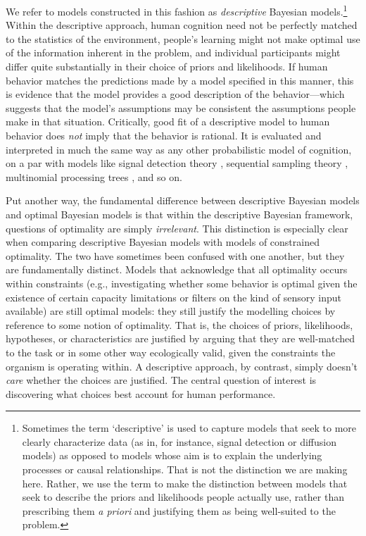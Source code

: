 \documentclass[doc,floatsintext]{apa6}
\begin{document}
We refer to models constructed in this fashion as {\it descriptive} Bayesian models.\footnote{Sometimes the term `descriptive' is used to capture models that seek to more clearly characterize data (as in, for instance, signal detection or diffusion models) as opposed to models whose aim is to explain the underlying processes or causal relationships. That is not the distinction we are making here. Rather, we use the term to make the distinction between models that seek to describe the priors and likelihoods people actually use, rather than prescribing them {\it a priori} and justifying them as being well-suited to the problem.} Within the descriptive approach, human cognition need not be perfectly matched to the statistics of the environment, people's learning might not make optimal use of the information inherent in the problem, and individual participants might differ quite substantially in their choice of priors and likelihoods. If human behavior matches the predictions made by a model specified in this manner, this is evidence that the model provides a good description of the behavior---which suggests that the model's assumptions may be consistent the assumptions people make in that situation. Critically, good fit of a descriptive model to human behavior does {\it not} imply that the behavior is rational. It is evaluated and interpreted in much the same way as any other probabilistic model of cognition, on a par with models like signal detection theory \cite{macmillan_detection_2004}, sequential sampling theory \cite{ratcliff_comparison_2004}, multinomial processing trees \cite{batchelder_multinomial_1990}, and so on.

Put another way, the fundamental difference between descriptive Bayesian models and optimal Bayesian models is that within the descriptive Bayesian framework, questions of optimality are simply {\it irrelevant}. This distinction is especially clear when comparing descriptive Bayesian models with models of constrained optimality. The two have sometimes been confused with one another, but they are fundamentally distinct. Models that acknowledge that all optimality occurs within constraints (e.g., investigating whether some behavior is optimal given the existence of certain capacity limitations or filters on the kind of sensory input available) are still optimal models: they still justify the modelling choices by reference to some notion of optimality. That is, the choices of priors, likelihoods, hypotheses, or characteristics are justified by arguing that they are well-matched to the task or in some other way ecologically valid, given the constraints the organism is operating within. A descriptive approach, by contrast, simply doesn't {\it care} whether the choices are justified. The central question of interest is discovering what choices best account for human performance.
\end{document}
